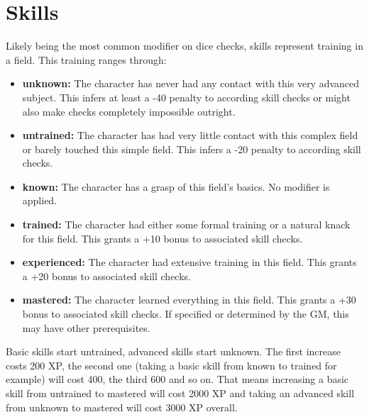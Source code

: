 \documentclass[12pt,a4paper,openany,usenames,dvipsnames]{book}
\begin{document}
	\section{Skills}
	Likely being the most common modifier on dice checks, skills represent training in a field. This training ranges through:
	\begin{itemize}
		\setlength\itemsep{-8mm}
		\item \textbf{unknown:} The character has never had any contact with this very advanced subject. 
		This infers at least a -40 penalty to according skill checks or might also make checks completely impossible outright.
		\item \textbf{untrained:} The character has had very little contact with this complex field or barely touched this simple field.
		This infers a -20 penalty to according skill checks.
		\item \textbf{known:} The character has a grasp of this field’s basics. No modifier is applied.
		\item \textbf{trained:} The character had either some formal training or a natural knack for this field. This grants a +10 bonus to associated skill checks.
		\item \textbf{experienced:} The character had extensive training in this field. This grants a +20 bonus to associated skill checks.
		\item \textbf{mastered:} The character learned everything in this field. This grants a +30 bonus to associated skill checks. If specified or determined by the GM, this may have other prerequisites.
	\end{itemize}
	Basic skills start untrained, advanced skills start unknown. The first increase costs 200 XP, the second one (taking a basic skill from known to trained for example) will cost 400, the third 600 and so on. That means increasing a basic skill from untrained to mastered will cost 2000 XP and taking an advanced skill from unknown to mastered will cost 3000 XP overall.
\end{document}
